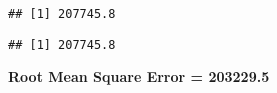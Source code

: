 \documentclass[
]{article}
\newenvironment{Shaded}{\begin{snugshade}}{\end{snugshade}}
\newcommand{\AttributeTok}[1]{\textcolor[rgb]{0.13,0.29,0.53}{#1}}
\newcommand{\FunctionTok}[1]{\textcolor[rgb]{0.13,0.29,0.53}{\textbf{#1}}}
\newcommand{\NormalTok}[1]{#1}
\newcommand{\OtherTok}[1]{\textcolor[rgb]{0.56,0.35,0.01}{#1}}
\newcommand{\SpecialCharTok}[1]{\textcolor[rgb]{0.81,0.36,0.00}{\textbf{#1}}}
\begin{document}
\begin{verbatim}
## [1] 207745.8
\end{verbatim}

\begin{Shaded}
\end{Shaded}

\begin{verbatim}
## [1] 207745.8
\end{verbatim}

\textbf{Root Mean Square Error = 203229.5}
\end{document}
